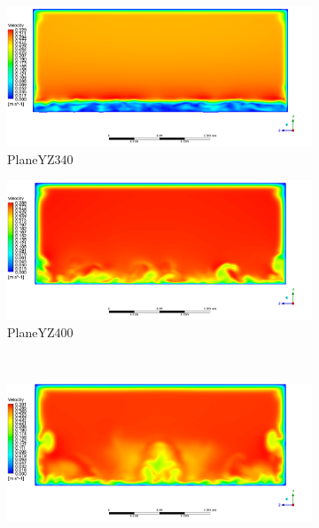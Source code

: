 	\begin{figure}[H]
		\begin{subfigure}{.5\textwidth}
			\centering
			\includegraphics[width=1.1\linewidth]{../Assets/T16_Velocity_ContourYZ340}
			\caption{PlaneYZ340}
			\label{fig:T16VelocityContourYZ340}
		\end{subfigure}%
		\begin{subfigure}{.5\textwidth}
			\centering
			\includegraphics[width=1.1\linewidth]{../Assets/T16_Velocity_ContourYZ400}
			\caption{PlaneYZ400}
			\label{fig:T16VelocityContourYZ400}
		\end{subfigure}
		\\
		\begin{subfigure}{.5\textwidth}
			\centering
			\includegraphics[width=1.1\linewidth]{../Assets/T16_Velocity_ContourYZ600}

\end{subfigure}
\end{figure}
